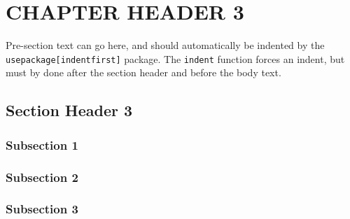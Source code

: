 \chapter{CHAPTER HEADER 3}\label{ch:change_this_3}






\setlength{\parindent}{10mm} %
\indent Pre-section text can go here, and should automatically be indented by the \texttt{usepackage[indentfirst]} package. The \texttt{indent} function forces an indent, but must by done after the section header and before the body text.




\flushleft
\section*{Section Header 3}

\setlength{\parindent}{10mm}
\indent \lipsum[10-12]




\flushleft
\subsection*{Subsection 1}

\setlength{\parindent}{10mm}
\lipsum[13]




\flushleft
\subsection*{Subsection 2}

\setlength{\parindent}{10mm}
\lipsum[14-15]




\flushleft
\subsection*{Subsection 3}

\setlength{\parindent}{10mm}
\lipsum[16-17]




\pagebreak